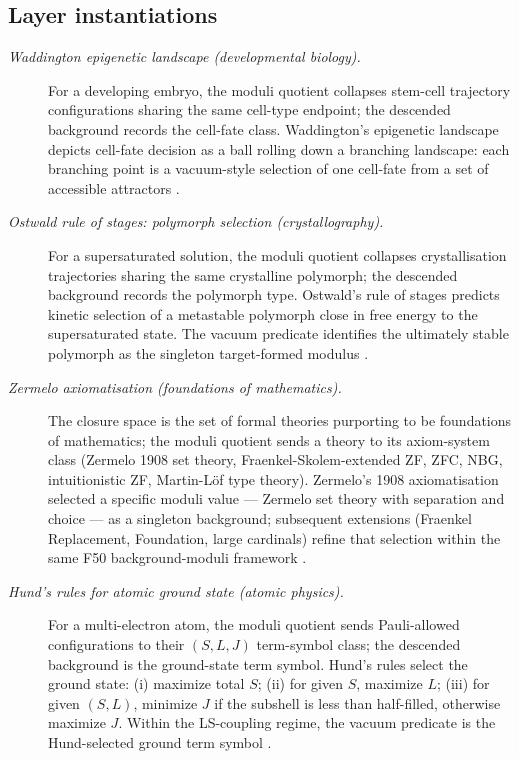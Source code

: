 \documentclass[11pt]{article}
\theoremstyle{definition}
\begin{document}
\subsection*{Layer instantiations}\label{layer-inst:F50}

\begin{description}
\item[\emph{Waddington epigenetic landscape
(developmental biology).}]
For a developing embryo, the moduli quotient
collapses stem-cell trajectory configurations
sharing the same cell-type endpoint; the
descended background records the cell-fate class.
Waddington's epigenetic landscape depicts cell-fate
decision as a ball rolling down a branching
landscape: each branching point is a vacuum-style
selection of one cell-fate from a set of accessible
attractors \citep{Waddington1957Strategy}.

\item[\emph{Ostwald rule of stages: polymorph
selection (crystallography).}]
For a supersaturated solution, the moduli quotient
collapses crystallisation trajectories sharing the
same crystalline polymorph; the descended
background records the polymorph type.  Ostwald's
rule of stages predicts kinetic selection of a
metastable polymorph close in free energy to the
supersaturated state.  The vacuum predicate
identifies the ultimately stable polymorph as the
singleton target-formed modulus
\citep{Ostwald1897Studien}.

\item[\emph{Zermelo axiomatisation (foundations
of mathematics).}]
The closure space is the set of formal theories
purporting to be foundations of mathematics; the
moduli quotient sends a theory to its axiom-system
class (Zermelo 1908 set theory,
Fraenkel-Skolem-extended ZF, ZFC, NBG, intuitionistic
ZF,
Martin-Löf type theory).  Zermelo's 1908
axiomatisation selected a specific moduli value —
Zermelo set theory with separation and choice —
as a singleton background; subsequent extensions
(Fraenkel Replacement, Foundation, large cardinals)
refine that selection within the same F50
background-moduli framework
\citep{Zermelo1908Untersuchungen}.

\item[\emph{Hund's rules for atomic ground state
(atomic physics).}]
For a multi-electron atom, the moduli quotient
sends Pauli-allowed configurations to their
\((S,L,J)\) term-symbol class; the descended
background is the ground-state term symbol.
Hund's rules select the ground state: (i) maximize
total \(S\); (ii) for given \(S\), maximize \(L\);
(iii) for given \((S,L)\), minimize \(J\) if the
subshell is less than half-filled, otherwise
maximize \(J\).  Within the LS-coupling regime, the
vacuum predicate is the Hund-selected ground term
symbol \citep{Hund1925Linienspektren}.


\end{description}
\end{document}
